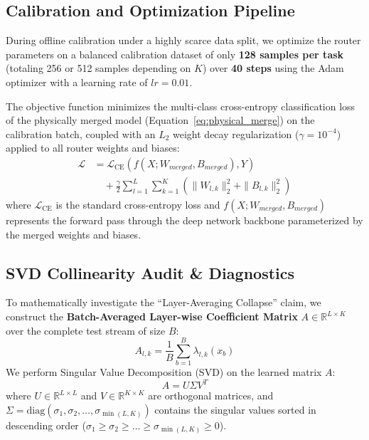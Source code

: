 \subsection{Calibration and Optimization Pipeline}

During offline calibration under a highly scarce data split, we optimize the router parameters on a balanced calibration dataset of only \textbf{128 samples per task} (totaling 256 or 512 samples depending on $K$) over \textbf{40 steps} using the Adam optimizer with a learning rate of $lr = 0.01$.

The objective function minimizes the multi-class cross-entropy classification loss of the physically merged model (Equation~\ref{eq:physical_merge}) on the calibration batch, coupled with an $L_2$ weight decay regularization ($\gamma = 10^{-4}$) applied to all router weights and biases:
\begin{equation}
\label{eq:total_loss}
\begin{aligned}
\mathcal{L} &= \mathcal{L}_{\mathrm{CE}}\left(f(X; W_{merged}, B_{merged}), Y\right) \\
&\quad + \frac{\gamma}{2} \sum_{l=1}^L \sum_{k=1}^K \left( \|W_{l, k}\|_2^2 + \|B_{l, k}\|_2^2 \right)
\end{aligned}
\end{equation}
where $\mathcal{L}_{\mathrm{CE}}$ is the standard cross-entropy loss and $f(X; W_{merged}, B_{merged})$ represents the forward pass through the deep network backbone parameterized by the merged weights and biases.

\subsection{SVD Collinearity Audit \& Diagnostics}

To mathematically investigate the ``Layer-Averaging Collapse'' claim, we construct the \textbf{Batch-Averaged Layer-wise Coefficient Matrix} $A \in \mathbb{R}^{L \times K}$ over the complete test stream of size $B$:
\begin{equation}
A_{l, k} = \frac{1}{B} \sum_{b=1}^B \lambda_{l, k}(x_b)
\end{equation}
We perform Singular Value Decomposition (SVD) on the learned matrix $A$:
\begin{equation}
A = U \Sigma V^T
\end{equation}
where $U \in \mathbb{R}^{L \times L}$ and $V \in \mathbb{R}^{K \times K}$ are orthogonal matrices, and $\Sigma = \text{diag}(\sigma_1, \sigma_2, \dots, \sigma_{\min(L, K)})$ contains the singular values sorted in descending order ($\sigma_1 \ge \sigma_2 \ge \dots \ge \sigma_{\min(L, K)} \ge 0$).

